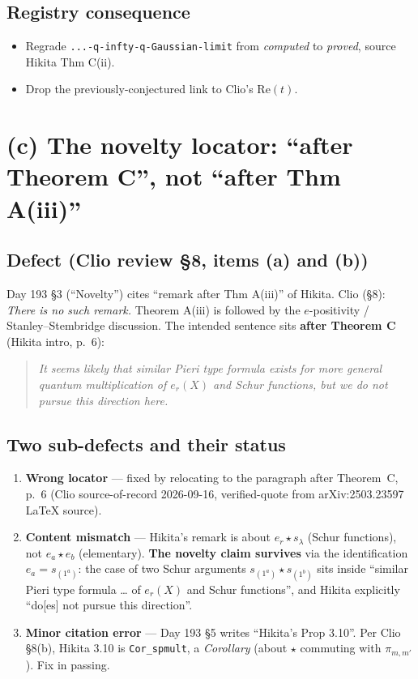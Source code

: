 \documentclass[11pt]{article}
\theoremstyle{definition}
\begin{document}
\subsection*{Registry consequence}
\begin{itemize}[leftmargin=1.5em]
  \item Regrade \verb|...-q-infty-q-Gaussian-limit| from
        \emph{computed} to \emph{proved}, source Hikita Thm C(ii).
  \item Drop the previously-conjectured link to Clio's $\mathrm{Re}(t)$.
\end{itemize}

\section{(c) The novelty locator: ``after Theorem C'', not ``after Thm A(iii)''}
\label{sec:novelty}

\subsection*{Defect (Clio review \S 8, items (a) and (b))}
Day 193 \S 3 (``Novelty'') cites ``remark after Thm A(iii)'' of Hikita.
Clio (\S 8): \emph{There is no such remark.} Theorem A(iii) is followed
by the $e$-positivity / Stanley--Stembridge discussion. The intended
sentence sits \textbf{after Theorem C} (Hikita intro, p.~6):
\begin{quote}\itshape
It seems likely that similar Pieri type formula exists for more
general quantum multiplication of $e_r(X)$ and Schur functions, but we
do not pursue this direction here.
\end{quote}

\subsection*{Two sub-defects and their status}
\begin{enumerate}[leftmargin=1.5em]
  \item \textbf{Wrong locator} --- fixed by relocating to the paragraph
        after Theorem~C, p.~6 (Clio source-of-record 2026-09-16,
        verified-quote from arXiv:2503.23597 LaTeX source).
  \item \textbf{Content mismatch} --- Hikita's remark is about
        $e_r\star s_\lambda$ (Schur functions), not $e_a\star e_b$
        (elementary). \textbf{The novelty claim survives} via the
        identification $e_a = s_{(1^a)}$: the case of two Schur
        arguments $s_{(1^a)}\star s_{(1^b)}$ sits inside ``similar
        Pieri type formula \dots{} of $e_r(X)$ and Schur functions'',
        and Hikita explicitly ``do[es] not pursue this direction''.
  \item \textbf{Minor citation error} --- Day 193 \S 5 writes
        ``Hikita's Prop 3.10''. Per Clio \S 8(b), Hikita 3.10 is
        \texttt{Cor\_spmult}, a \emph{Corollary} (about $\star$
        commuting with $\pi_{m,m'}$). Fix in passing.
\end{enumerate}
\end{document}
